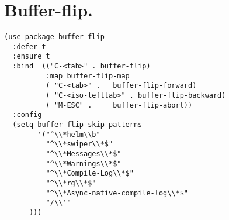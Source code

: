 \documentclass[11pt]{article}
\begin{document}
\section{Buffer-flip.}
\label{sec:orge1b83fc}
\begin{verbatim}
(use-package buffer-flip
  :defer t
  :ensure t
  :bind  (("C-<tab>" . buffer-flip)
          :map buffer-flip-map
          ( "C-<tab>" .   buffer-flip-forward) 
          ( "C-<iso-lefttab>" . buffer-flip-backward) 
          ( "M-ESC" .     buffer-flip-abort))
  :config
  (setq buffer-flip-skip-patterns
        '("^\\*helm\\b"
          "^\\*swiper\\*$"
          "^\\*Messages\\*$"
          "^\\*Warnings\\*$"
          "^\\*Compile-Log\\*$"
          "^\\*rg\\*$"
          "^\\*Async-native-compile-log\\*$"
          "/\\'"
      )))
\end{verbatim}
\end{document}
